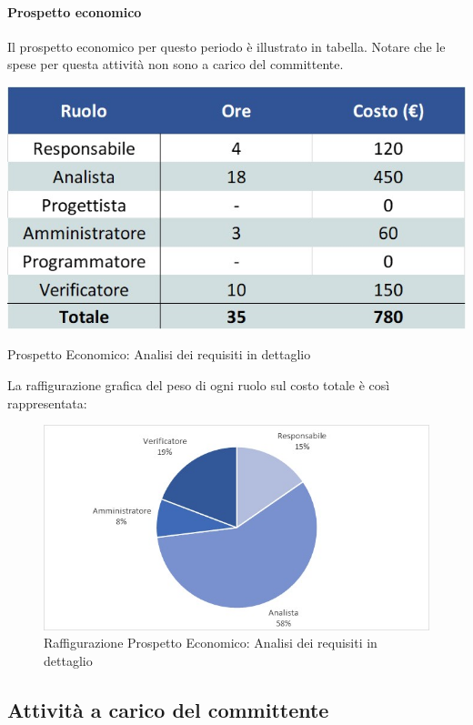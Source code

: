 \paragraph{Prospetto economico} \label{PreventivoAnalisiRequisitiDettaglio}
Il prospetto economico per questo periodo è illustrato in tabella. Notare che le spese per questa attività non sono a carico del committente.
\begin{table}[H]
	\centerline{\includegraphics[scale=0.7]{img/Preventivo/AnalisiRequisitiDettaglioEconomico.jpg}}
	\caption{Prospetto Economico: Analisi dei requisiti in dettaglio}
	\clearpage
\end{table}
La raffigurazione grafica del peso di ogni ruolo sul costo totale è così rappresentata: 
\begin{figure}[H]
	\centerline{\includegraphics[scale=0.9]{img/Preventivo/Torte/AnalisiRequisitiDettaglio.jpg}}
	\caption{Raffigurazione Prospetto Economico: Analisi dei requisiti in dettaglio}
	\clearpage
\end{figure}
\newpage
\subsection{Attività a carico del committente}
